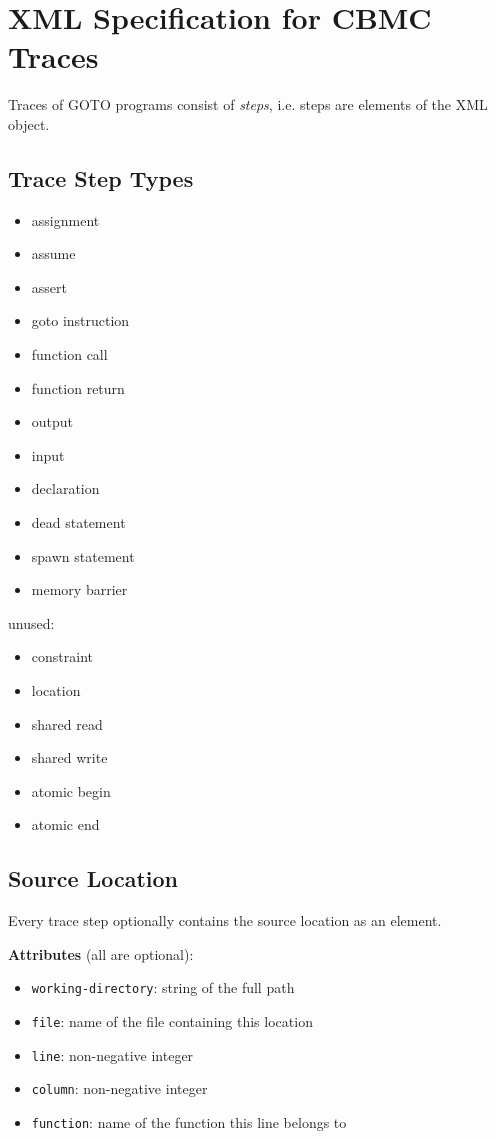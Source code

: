 \documentclass[12pt]{article}
\begin{document}
\section{XML Specification for CBMC Traces}

Traces of GOTO programs consist of \emph{steps}, i.e. steps are elements of the
XML object.

\subsection{Trace Step Types}

\begin{itemize}
\item assignment
\item assume
\item assert
\item goto instruction
\item function call
\item function return
\item output
\item input
\item declaration
\item dead statement
\item spawn statement
\item memory barrier
\end{itemize}

unused:
\begin{itemize}
\item constraint
\item location
\item shared read
\item shared write
\item atomic begin
\item atomic end
\end{itemize}

\subsection{Source Location}

\noindent Every trace step optionally contains the source location as an
element.

\noindent\textbf{Attributes} (all are optional):
\begin{itemize}
\item \texttt{working-directory}: string of the full path
\item \texttt{file}: name of the file containing this location
\item \texttt{line}: non-negative integer
\item \texttt{column}: non-negative integer
\item \texttt{function}: name of the function this line belongs to
\end{itemize}
\end{document}
